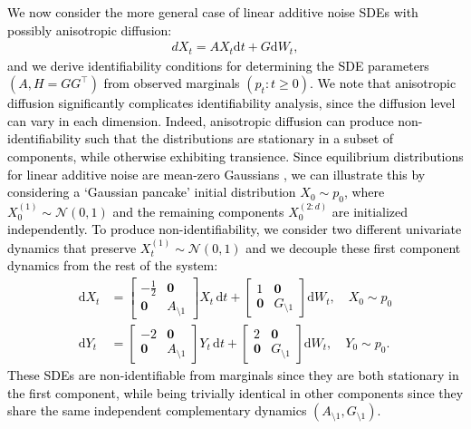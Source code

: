 \documentclass[twoside,11pt]{article}
\newcommand{\dt}{\mathrm{d}t}
\newcommand{\dWt}{\mathrm{d}W_t}
\newcommand{\rv}[1]{\textcolor{black}{#1}}
\begin{document}
\rv{We now consider the more general case of linear additive noise SDEs with possibly anisotropic diffusion:
\begin{align}
    dX_t = AX_t \dt + G \dWt,
    \label{eq: anisotropic_linear_sde}
\end{align}
and we derive identifiability conditions for determining the SDE parameters $(A, H = GG^\top)$ from observed marginals $(p_t: t \ge 0)$. We note that anisotropic diffusion significantly complicates identifiability analysis, since the diffusion level can vary in each dimension. Indeed, anisotropic diffusion can produce non-identifiability such that the distributions are stationary in a subset of components, while otherwise exhibiting transience. Since equilibrium distributions for linear additive noise are mean-zero Gaussians \citep[Sections 4.2 and 4.4]{pavliotis2014stochastic}, we can illustrate this by considering a `Gaussian pancake' initial distribution $X_0 \sim p_0$, where
$X_0^{(1)} \sim \mathcal{N}(0, 1)$ and the remaining components
$X_0^{(2:d)}$ are initialized independently. To produce non-identifiability, we consider two different univariate dynamics that preserve $X_t^{(1)} \sim \mathcal{N}(0, 1)$ and we decouple these first component dynamics from the rest of the system:
\begin{align}
\mathrm{d} X_t &= \begin{bmatrix} -\frac{1}{2} & \mathbf{0} \\ \mathbf{0} & A_{\setminus1} \end{bmatrix} X_t \,\mathrm{d}t + \begin{bmatrix} 1 & \mathbf{0} \\ \mathbf{0} & G_{\setminus1}  \end{bmatrix} \mathrm{d}W_t, \quad X_0 \sim p_0 \\
\mathrm{d}Y_t &= \begin{bmatrix} -2 & \mathbf{0} \\ \mathbf{0} & A_{\setminus1} \end{bmatrix} Y_t \,\mathrm{d}t + \begin{bmatrix} 2 & \mathbf{0} \\ \mathbf{0} & G_{\setminus1}  \end{bmatrix} \mathrm{d}W_t, \quad Y_0 \sim p_0.
\end{align}
These SDEs are non-identifiable from marginals since they are both stationary in the first component, while being trivially identical in other components since they share the same independent complementary dynamics $(A_{\setminus1}, G_{\setminus1})$.}
\end{document}
